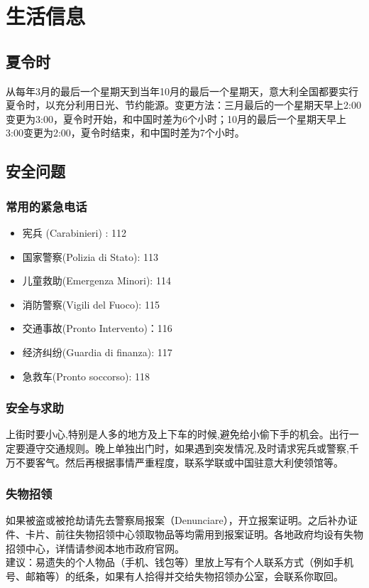 \chapter{生活信息}              

\section{夏令时} 

从每年3月的最后一个星期天到当年10月的最后一个星期天，意大利全国都要实行夏令时，以充分利用日光、节约能源。变更方法：三月最后的一个星期天早上2:00变更为3:00，夏令时开始，和中国时差为6个小时；10月的最后一个星期天早上3:00变更为2:00，夏令时结束，和中国时差为7个小时。

\section{安全问题}

\subsection{常用的紧急电话}

\begin{itemize}
\item 宪兵 (Carabinieri) : 112 
\item 国家警察(Polizia di Stato): 113 
\item 儿童救助(Emergenza Minori): 114
\item 消防警察(Vigili del Fuoco): 115 
\item 交通事故(Pronto Intervento)：116 
\item 经济纠纷(Guardia di finanza): 117
\item 急救车(Pronto soccorso): 118
\end{itemize}

\subsection{安全与求助}
上街时要小心,特别是人多的地方及上下车的时候,避免给小偷下手的机会。出行一定要遵守交通规则。晚上单独出门时，如果遇到突发情况,及时请求宪兵或警察,千万不要客气。然后再根据事情严重程度，联系学联或中国驻意大利使领馆等。

\subsection{失物招领}
如果被盗或被抢劫请先去警察局报案（Denunciare），开立报案证明。之后补办证件、卡片、前往失物招领中心领取物品等均需用到报案证明。各地政府均设有失物招领中心，详情请参阅本地市政府官网。
\\
建议：易遗失的个人物品（手机、钱包等）里放上写有个人联系方式（例如手机号、邮箱等）的纸条，如果有人拾得并交给失物招领办公室，会联系你取回。

